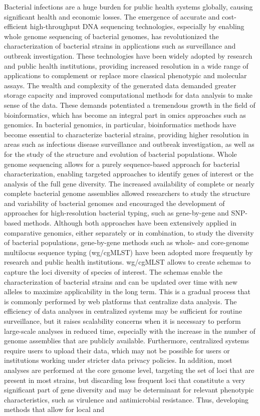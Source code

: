 


Bacterial infections are a huge burden for public health systems globally, causing significant health and economic losses. The emergence of accurate and cost-efficient high-throughput DNA sequencing technologies, especially by enabling whole genome sequencing of bacterial genomes, has revolutionized the characterization of bacterial strains in applications such as surveillance and outbreak investigation. These technologies have been widely adopted by research and public health institutions, providing increased resolution in a wide range of applications to complement or replace more classical phenotypic and molecular assays. The wealth and complexity of the generated data demanded greater storage capacity and improved computational methods for data analysis to make sense of the data. These demands potentiated a tremendous growth in the field of bioinformatics, which has become an integral part in omics approaches such as genomics. In bacterial genomics, in particular, bioinformatics methods have become essential to characterize bacterial strains, providing higher resolution in areas such as infectious disease surveillance and outbreak investigation, as well as for the study of the structure and evolution of bacterial populations. Whole genome sequencing allows for a purely sequence-based approach for bacterial characterization, enabling targeted approaches to identify genes of interest or the analysis of the full gene diversity. The increased availability of complete or nearly complete bacterial genome assemblies allowed researchers to study the structure and variability of bacterial genomes and encouraged the development of approaches for high-resolution bacterial typing, such as gene-by-gene and SNP-based methods. Although both approaches have been extensively applied in comparative genomics, either separately or in combination, to study the diversity of bacterial populations, gene-by-gene methods such as whole- and core-genome multilocus sequence typing (wg/cgMLST) have been adopted more frequently by research and public health institutions. wg/cgMLST allows to create schemas to capture the loci diversity of species of interest. The schemas enable the characterization of bacterial strains and can be updated over time with new alleles to maximize applicability in the long term. This is a gradual process that is commonly performed by web platforms that centralize data analysis. The efficiency of data analyses in centralized systems may be sufficient for routine surveillance, but it raises scalability concerns when it is necessary to perform large-scale analyses in reduced time, especially with the increase in the number of genome assemblies that are publicly available. Furthermore, centralized systems require users to upload their data, which may not be possible for users or institutions working under stricter data privacy policies. In addition, most analyses are performed at the core genome level, targeting the set of loci that are present in most strains, but discarding less frequent loci that constitute a very significant part of gene diversity and may be determinant for relevant phenotypic characteristics, such as virulence and antimicrobial resistance. Thus, developing methods that allow for local and 